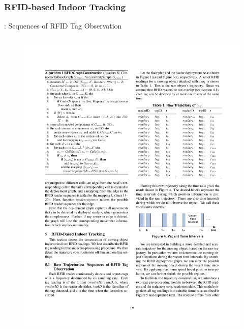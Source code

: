 
\begin{frame}
\frametitle{RFID-based Indoor Tracking}

  \small{: \textrm{Sequences of RFID Tag Observation}}

  \begin{columns}[c]

    \begin{figure}[tb]
      \includegraphics[width=\columnwidth]{figures/2-1/2-1-6.pdf}
    \end{figure}


\end{columns}
\end{frame}
